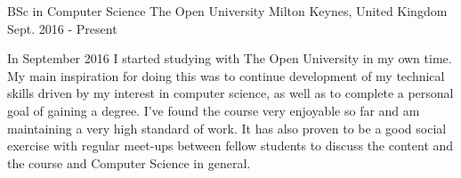 

\begin{cventries}

  \cventry
    {BSc in Computer Science} %
    {The Open University} %
    {Milton Keynes, United Kingdom} %
    {Sept. 2016 - Present} %
    {
      \begin{cvitems} %
        {In September 2016 I started studying with The Open University in my own time. My main inspiration for doing this was to continue development of my technical skills driven by my interest in computer science, as well as to complete a personal goal of gaining a degree. I’ve found the course very enjoyable so far and am maintaining a very high standard of work. It has also proven to be a good social exercise with regular meet-ups between fellow students to discuss the content and the course and Computer Science in general.}
      \end{cvitems}
    }


\end{cventries}
